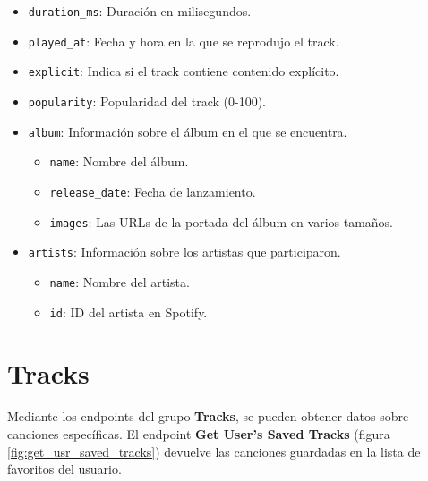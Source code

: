 \begin{itemize}
\begin{itemize}
\begin{itemize}
                        \item \texttt{duration\_ms}: Duración en milisegundos.
                        \item \texttt{played\_at}: Fecha y hora en la que se reprodujo el track.
                        \item \texttt{explicit}: Indica si el track contiene contenido explícito.
                        \item \texttt{popularity}: Popularidad del track (0-100).
                        \item \texttt{album}: Información sobre el álbum en el que se encuentra.
                              \begin{itemize}
                                  \item \texttt{name}: Nombre del álbum.
                                  \item \texttt{release\_date}: Fecha de lanzamiento.
                                  \item \texttt{images}: Las URLs de la portada del álbum en varios tamaños.
                              \end{itemize}
                        \item \texttt{artists}: Información sobre los artistas que participaron.
                              \begin{itemize}
                                  \item \texttt{name}: Nombre del artista.
                                  \item \texttt{id}: ID del artista en Spotify.
                              \end{itemize}
                    \end{itemize}
          \end{itemize}
\end{itemize}

\newpage

\section*{Tracks} \label{sec:estudio_api_tracks}

Mediante los endpoints del grupo \textbf{Tracks}, se pueden obtener datos sobre canciones específicas. El endpoint \textbf{Get User's Saved Tracks} (figura \ref{fig:get_usr_saved_tracks}) devuelve las canciones guardadas en la lista de favoritos del usuario.

